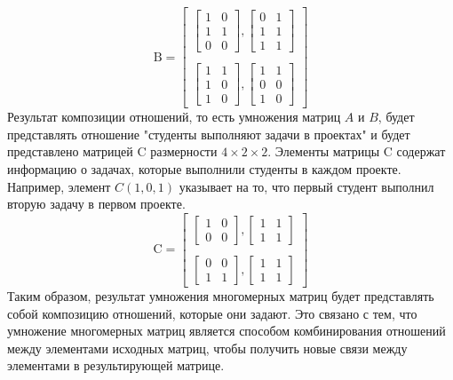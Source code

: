 \documentclass{article}
\begin{document}
\[
\text{B} = \begin{bmatrix}
    \begin{bmatrix}
      1 & 0 \\
      1 & 1 \\
      0 & 0 
    \end{bmatrix} , 

    \begin{bmatrix}  
      0 & 1 \\
      1 & 1 \\
      1 & 1
    \end{bmatrix} \\\\
    \begin{bmatrix} 
      1 & 1 \\
      1 & 0 \\
      1 & 0
    \end{bmatrix},
    
    \begin{bmatrix} 
      1 & 1 \\
      0 & 0 \\
      1 & 0 
    \end{bmatrix}
\end{bmatrix}
\] 
Результат композиции отношений, то есть умножения матриц $A$ и $B$, будет представлять отношение "студенты выполняют задачи в проектах" и будет представлено матрицей C размерности $4 \times 2 \times 2$. Элементы матрицы C содержат информацию о задачах, которые выполнили студенты в каждом проекте. Например, элемент $C(1, 0, 1)$ указывает на то, что первый студент выполнил вторую задачу в первом проекте.
\[
\text{C} = \begin{bmatrix}
      \begin{bmatrix}
        1 & 0 \\
        0 & 0
      \end{bmatrix}, 
      \begin{bmatrix} 
        1 & 1 \\
        1 & 1
      \end{bmatrix} \\\\
      \begin{bmatrix}
        0 & 0 \\
        1 & 1
      \end{bmatrix}, 
      \begin{bmatrix}
        1 & 1 \\
        1 & 1
      \end{bmatrix}
\end{bmatrix}
\] 
Таким образом, результат умножения многомерных матриц будет представлять собой композицию отношений, которые они задают. Это связано с тем, что умножение многомерных матриц является способом комбинирования отношений между элементами исходных матриц, чтобы получить новые связи между элементами в результирующей матрице.
\end{document}
